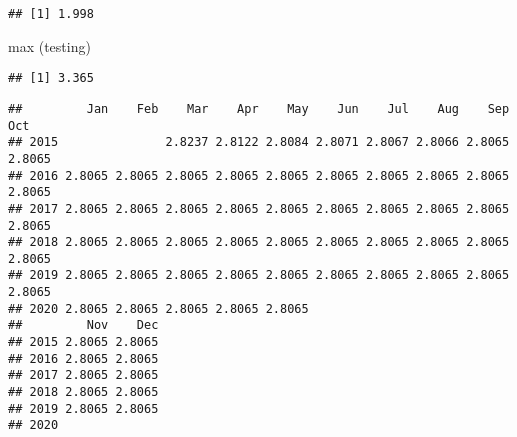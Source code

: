 \documentclass[
]{article}
\newenvironment{Shaded}{\begin{snugshade}}{\end{snugshade}}
\newcommand{\AttributeTok}[1]{\textcolor[rgb]{0.77,0.63,0.00}{#1}}
\newcommand{\DecValTok}[1]{\textcolor[rgb]{0.00,0.00,0.81}{#1}}
\newcommand{\FunctionTok}[1]{\textcolor[rgb]{0.00,0.00,0.00}{#1}}
\newcommand{\NormalTok}[1]{#1}
\newcommand{\OtherTok}[1]{\textcolor[rgb]{0.56,0.35,0.01}{#1}}
\newcommand{\SpecialCharTok}[1]{\textcolor[rgb]{0.00,0.00,0.00}{#1}}
\newcommand{\StringTok}[1]{\textcolor[rgb]{0.31,0.60,0.02}{#1}}
\begin{document}
\begin{verbatim}
## [1] 1.998
\end{verbatim}

\begin{Shaded}
\begin{Highlighting}[]
\FunctionTok{max}\NormalTok{ (testing)}
\end{Highlighting}
\end{Shaded}

\begin{verbatim}
## [1] 3.365
\end{verbatim}

\begin{Shaded}
\end{Shaded}

\begin{verbatim}
##         Jan    Feb    Mar    Apr    May    Jun    Jul    Aug    Sep    Oct
## 2015               2.8237 2.8122 2.8084 2.8071 2.8067 2.8066 2.8065 2.8065
## 2016 2.8065 2.8065 2.8065 2.8065 2.8065 2.8065 2.8065 2.8065 2.8065 2.8065
## 2017 2.8065 2.8065 2.8065 2.8065 2.8065 2.8065 2.8065 2.8065 2.8065 2.8065
## 2018 2.8065 2.8065 2.8065 2.8065 2.8065 2.8065 2.8065 2.8065 2.8065 2.8065
## 2019 2.8065 2.8065 2.8065 2.8065 2.8065 2.8065 2.8065 2.8065 2.8065 2.8065
## 2020 2.8065 2.8065 2.8065 2.8065 2.8065                                   
##         Nov    Dec
## 2015 2.8065 2.8065
## 2016 2.8065 2.8065
## 2017 2.8065 2.8065
## 2018 2.8065 2.8065
## 2019 2.8065 2.8065
## 2020
\end{verbatim}

\begin{Shaded}
\end{Shaded}
\end{document}
